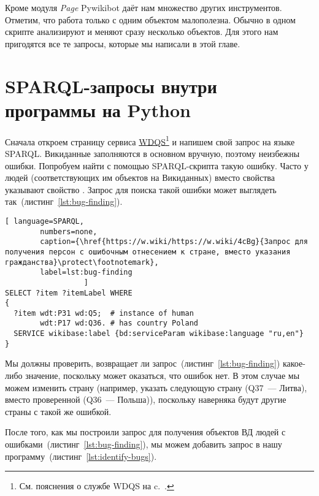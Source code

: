 Кроме модуля \textit{Page} Pywikibot даёт нам множество других инструментов. Отметим, что работа только с одним объектом малополезна. Обычно в одном скрипте анализируют и меняют сразу несколько объектов. Для этого нам пригодятся все те запросы, которые мы написали в этой главе.


\section{SPARQL-запросы внутри программы на Python}
\label{sec:running queries}

Сначала откроем страницу сервиса \href{https://query.wikidata.org/}{WDQS}\footnote[][0pt]{%
См. пояснения о службе WDQS на c.~\pageref{sect:WDQS}.%
}%
 и напишем свой запрос на языке SPARQL. 
Викиданные заполняются в основном вручную, поэтому неизбежны ошибки. 
Попробуем найти с помощью SPARQL-скрипта такую ошибку. 
Часто у людей (соответствующих им объектов на Викиданных) 
вместо свойства  указывают свойство . 
Запрос для поиска такой ошибки может выглядеть так~(листинг~\ref{lst:bug-finding}).

\begin{lstlisting}[ language=SPARQL,
        numbers=none,
        caption={\href{https://w.wiki/https://w.wiki/4cBg}{Запрос для получения персон с ошибочным отнесением к стране, вместо указания гражданства}\protect\footnotemark},
        label=lst:bug-finding
                  ]
SELECT ?item ?itemLabel WHERE 
{
  ?item wdt:P31 wd:Q5;  # instance of human
        wdt:P17 wd:Q36. # has country Poland
  SERVICE wikibase:label {bd:serviceParam wikibase:language "ru,en"}
}
\end{lstlisting}

Мы должны проверить, возвращает ли запрос~(листинг~\ref{lst:bug-finding}) какое-либо значение, поскольку может оказаться, что ошибок нет. В этом случае мы можем изменить страну (например, указать следующую страну (Q37~--- Литва), вместо проверенной (Q36~--- Польша)), поскольку наверняка будут другие страны с такой же ошибкой.

После того, как мы построили запрос для получения объектов ВД людей с ошибками~(листинг~\ref{lst:bug-finding}), мы можем добавить запрос в нашу программу~(листинг~\ref{lst:identify-bugs}).


